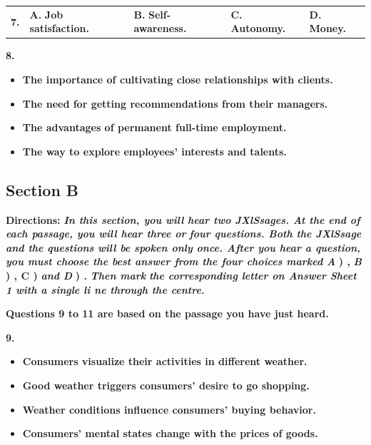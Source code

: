 \documentclass[UTF8,11pt]{ctexart}
\begin{document}
\noindent\begin{tabularx}{\linewidth}{@{}lXXXX@{}}\textbf{7.} & \textbf{A.} \textbf{Job satisfaction.} & \textbf{B.} \textbf{Self-awareness.} & \textbf{C.} \textbf{Autonomy.} & \textbf{D.} \textbf{Money.}\\\end{tabularx}\par

\textbf{8.}


\begin{itemize}[leftmargin=2em,itemsep=.2em,topsep=.4em]\item[A.] \textbf{The importance of cultivating close relationships with clients.}
\item[B.] \textbf{The need for getting recommendations from their managers.}
\item[C.] \textbf{The advantages of permanent full-time employment.}
\item[D.] \textbf{The way to explore employees' interests and talents.}
\end{itemize}

\subsection*{\textbf{Section B}}


\textbf{Directions: }\textbf{\textit{In this section, you will hear two JXlSsages. At the end of each passage, you will hear three or}} \textbf{\textit{four questions. Both the JXlSsage and the questions will be spoken only once. After you hear a question,}} \textbf{\textit{you must choose the best answer from the four choices marked A }}\textbf{) , }\textbf{\textit{B }}\textbf{) , C ) }\textbf{\textit{and D }}\textbf{) . }\textbf{\textit{Then mark}} \textbf{\textit{the corresponding letter on Answer Sheet 1 with a single li ne through the centre.}}


\textbf{Questions 9 to 11 are based on the passage you have just heard.}


\textbf{9.}


\begin{itemize}[leftmargin=2em,itemsep=.2em,topsep=.4em]\item[A.] \textbf{Consumers visualize their activities in different weather.}
\item[B.] \textbf{Good weather triggers consumers' desire to go shopping.}
\item[C.] \textbf{Weather conditions influence consumers' buying behavior.}
\item[D.] \textbf{Consumers' mental states change with the prices of goods.}
\end{itemize}
\end{document}
